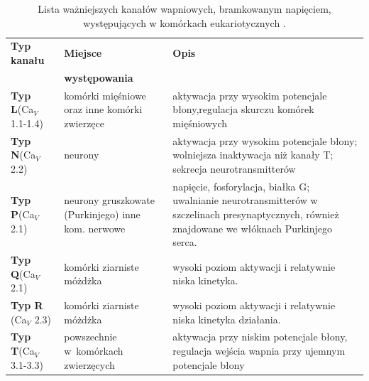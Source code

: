 \begin{table}[h]
\centering
\begin{tabular}{p{2.7cm}p{4.55cm}p{7cm}}
\toprule[0.12em]
\textbf{Typ kanału}& \textbf{Miejsce} & \textbf{Opis} \\
& \textbf{występowania} & \\\midrule[0.06em]
\rule[-2ex]{0pt}{5.5ex} \textbf{Typ L}\newline(Ca$_V$ 1.1-1.4) & komórki mięśniowe oraz inne komórki zwierzęce & aktywacja przy wysokim potencjale błony,regulacja skurczu komórek mięśniowych \\[1.2em]
\textbf{Typ N}\newline(Ca$_V$ 2.2) & neurony & aktywacja przy wysokim potencjale błony; wolniejsza inaktywacja niż kanały T; sekrecja neurotransmitterów \\[1.2em]
\textbf{Typ P}\newline(Ca$_V$ 2.1) & neurony gruszkowate (Purkinjego) inne kom. nerwowe & napięcie, fosforylacja, białka G; uwalnianie neurotransmitterów w szczelinach presynaptycznych, również znajdowane we włóknach Purkinjego serca.\\[1.2em]
\textbf{Typ Q}\newline(Ca$_V$ 2.1) \newline & komórki ziarniste móżdżka & wysoki poziom aktywacji i relatywnie niska kinetyka. \\[1.2em]
\textbf{Typ R} \newline(Ca$_V$ 2.3) & komórki ziarniste móżdżka & wysoki poziom aktywacji i relatywnie niska kinetyka działania. \\[1em]
\textbf{Typ T}\newline(Ca$_V$ 3.1-3.3) & powszechnie w~komórkach zwierzęcych & aktywacja przy niskim potencjale błony, regulacja wejścia wapnia przy ujemnym
potencjale błony \\[1em]
\bottomrule[0.12em]
\end{tabular}
\caption [Kanały bramkowane napięciem]{Lista ważniejszych kanałów wapniowych, bramkowanym napięciem, występujących w komórkach eukariotycznych \cite{Fill2002,McDonough2004,Simms2014,Yoshida1997}.}
\label{tab:vgcc}
\end{table}





